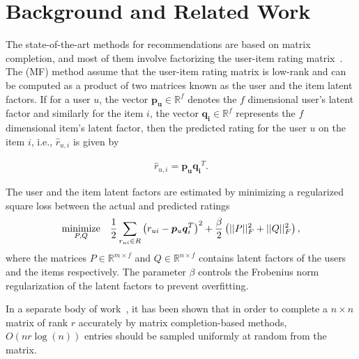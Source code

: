 \chapter{Background and Related Work}
\label{ch:related}

The state-of-the-art methods for recommendations are based on matrix
completion, and most of them involve factorizing the user-item rating
matrix~\cite{Koren2009, koren2008factorization, hu2008collaborative}.
The \MF (MF) method assume that the
user-item rating matrix is low-rank and can be computed as a product of two
matrices known as the user and the item latent factors. 
If for a user $u$, the vector $\bm{p_u} \in \mathbb{R}^f$ denotes the $f$ dimensional
user's latent factor and similarly for the item $i$, the vector 
$\bm{q_i} \in \mathbb{R}^f$ represents the $f$ dimensional item's latent factor, then the
predicted rating for the user $u$ on the item $i$, i.e., $\hat{r}_{u,i}$ is given by

\begin{equation} \label{mf_eq}
  \begin{split}
    \hat{r}_{u,i} = \bm{p_u}\bm{q_i}^T.
  \end{split}
\end{equation}


The user and the item latent factors are estimated by minimizing a regularized
square loss between the actual and predicted ratings 
\begin{equation} \label{mf_obj}
  \begin{aligned}
    \minimize_{P, Q} & &\frac{1}{2}\sum_{r_{ui} \in R}
    \left(r_{ui} - \bm{p}_u\bm{q}_i^T \right)^2+ \frac{\beta}{2}
    \left(||P||_F^2 + ||Q||_F^2 \right),
  \end{aligned}
\end{equation}
where the matrices $P \in \mathbb{R}^{m \times f}$ and $Q \in\mathbb{R}^{n \times f}$ 
contains latent factors of the users and the items
respectively. The parameter $\beta$ controls the Frobenius norm regularization
of the latent factors to prevent overfitting.

In a separate body of work~\cite{CandesTao2010, CandesRecht09}, it has been shown that in order to complete a $n \times n$ matrix of rank $r$
accurately by matrix completion-based methods, $O(nr \log(n))$ entries should be sampled uniformly at random from the
matrix.

